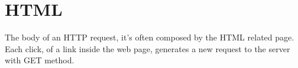\chapter{HTML}
The body of an HTTP request, it's often composed by the HTML related page. Each click, of a link inside the web page, generates a new request to the server with GET method.